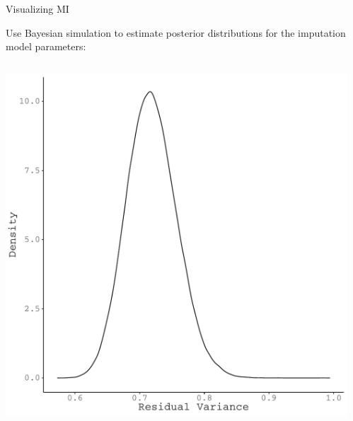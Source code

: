 \documentclass{beamer}\usepackage[]{graphicx}\usepackage[]{color}
\newenvironment{knitrout}{}{} %
\begin{document}
\begin{frame}{Visualizing MI}
  


Use Bayesian simulation to estimate posterior distributions for the imputation 
model parameters:\\

\vb

\begin{columns}
\begin{column}{0.5\textwidth}

\begin{knitrout}\footnotesize
{}\color{fgcolor}

{\centering \includegraphics[width=0.9\linewidth]{figure/unnamed-chunk-46-1} 

}



\end{knitrout}

\end{column}
\begin{column}{0.5\textwidth}
  
\begin{knitrout}\footnotesize
{}\color{fgcolor}


\end{knitrout}
\end{column}
\end{columns}
\end{frame}
\end{document}

